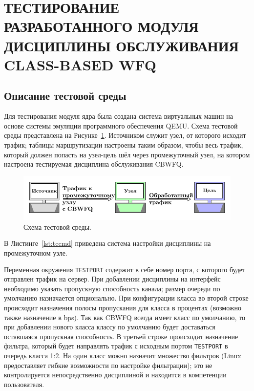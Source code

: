 \section{ТЕСТИРОВАНИЕ РАЗРАБОТАННОГО МОДУЛЯ ДИСЦИПЛИНЫ ОБСЛУЖИВАНИЯ CLASS-BASED WFQ}

	\subsection{Описание тестовой среды}

		Для тестирования модуля ядра была создана система виртуальных машин на основе
		системы эмуляции программного обеспечения QEMU. Схема тестовой среды представлена
		на Рисунке~\ref{pic:testscheme}. Источником служит узел, от которого исходит трафик;
		таблицы маршрутизации настроены таким образом, чтобы весь трафик, который
		должен попасть на узел-цель шёл через промежуточный узел, на котором
		настроена тестируемая дисциплина обслуживания CBWFQ.

        \begin{figure}[ht!]
        	\center
        	\includegraphics[scale=1.2]{pdfimages/test_scheme.pdf}
        	\caption{Схема тестовой среды.}
			\label{pic:testscheme}
        \end{figure}

		В Листинге~\ref{lst:tccmd} приведена система настройки дисциплины на промежуточном узле.

		Переменная окружения \lstinline{TESTPORT} содержит в себе номер порта,
		с которого будет отправлен трафик на сервер. При добавлении дисциплины
		на интерфейс необходимо указать пропускную способность канала; размер
		очереди по умолчанию назначается опционально. При конфигурации класса
		во второй строке происходит назначения полосы пропускания для класса
		в процентах (возможно также назначение в bps).
        Так как CBWFQ всегда имеет класс по умолчанию, то
		при добавлении нового класса классу по умолчанию будет доставаться
		оставшаяся пропускная способность.
        В третьей строке происходит
		назначение фильтра, который будет направлять трафик с исходным портом \lstinline{TESTPORT}
		в очередь класса 1:2. На один класс можно назначит множество фильтров
		(Linux предоставляет гибкие возможности по настройке фильтрации); это не
		контролируется непосредственно дисциплиной и находится в компетенции
		пользователя. 

